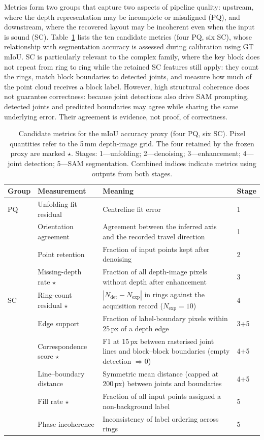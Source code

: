 \documentclass[a4paper,fleqn]{cas-dc}
\begin{document}
{Metrics form two groups that capture two aspects of pipeline quality: upstream, where the depth representation may be incomplete or misaligned (PQ), and downstream, where the recovered layout may be incoherent even when the input is sound (SC). Table~\ref{tab:candidate-features} lists the ten candidate metrics (four PQ, six SC), whose relationship with segmentation accuracy is assessed during calibration using GT mIoU. SC is particularly relevant to the complex family, where the key block does not repeat from ring to ring while the retained SC features still apply: they count the rings, match block boundaries to detected joints, and measure how much of the point cloud receives a block label. However, high structural coherence does not guarantee correctness: because joint detections also drive SAM prompting, detected joints and predicted boundaries may agree while sharing the same underlying error. Their agreement is evidence, not proof, of correctness.

\begin{table}[t]
\caption{Candidate metrics for the mIoU accuracy proxy (four PQ, six SC). Pixel quantities refer to the 5\,mm depth-image grid. The four retained by the frozen proxy are marked $\star$. Stages: 1---unfolding; 2---denoising; 3---enhancement; 4---joint detection; 5---SAM segmentation. Combined indices indicate metrics using outputs from both stages.}
\label{tab:candidate-features}
\centering
\small
\setlength{\tabcolsep}{3pt}
\begin{tabular}{p{} p{} p{} p{}}
\toprule
Group & Measurement & Meaning & Stage \\
\midrule
PQ & Unfolding fit residual & Centreline fit error & 1 \\
 & Orientation agreement & Agreement between the inferred axis and the recorded travel direction & 1 \\
 & Point retention & Fraction of input points kept after denoising & 2 \\
 & Missing-depth rate $\star$ & Fraction of all depth-image pixels without depth after enhancement & 3 \\
SC & Ring-count residual $\star$ & $|N_{\mathrm{det}}-N_{\mathrm{exp}}|$ in rings against the acquisition record ($N_{\mathrm{exp}}=10$) & 4 \\
 & Edge support & Fraction of label-boundary pixels within 25\,px of a depth edge & 3+5 \\
 & Correspondence score $\star$ & F1 at 15\,px between rasterised joint lines and block--block boundaries (empty detection $\Rightarrow 0$) & 4+5 \\
 & Line--boundary distance & Symmetric mean distance (capped at 200\,px) between joints and boundaries & 4+5 \\
 & Fill rate $\star$ & Fraction of all input points assigned a non-background label & 5 \\
 & Phase incoherence & Inconsistency of label ordering across rings & 5 \\
\bottomrule
\end{tabular}
\end{table}

}
\end{document}
